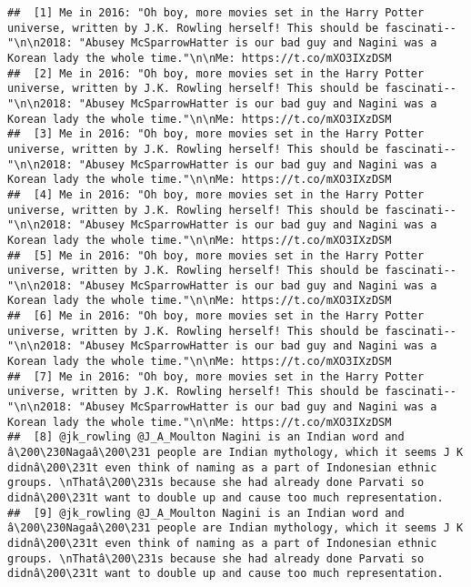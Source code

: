 \documentclass[]{article}
\begin{document}
\begin{verbatim}
##  [1] Me in 2016: "Oh boy, more movies set in the Harry Potter universe, written by J.K. Rowling herself! This should be fascinati--"\n\n2018: "Abusey McSparrowHatter is our bad guy and Nagini was a Korean lady the whole time."\n\nMe: https://t.co/mXO3IXzDSM                                          
##  [2] Me in 2016: "Oh boy, more movies set in the Harry Potter universe, written by J.K. Rowling herself! This should be fascinati--"\n\n2018: "Abusey McSparrowHatter is our bad guy and Nagini was a Korean lady the whole time."\n\nMe: https://t.co/mXO3IXzDSM                                          
##  [3] Me in 2016: "Oh boy, more movies set in the Harry Potter universe, written by J.K. Rowling herself! This should be fascinati--"\n\n2018: "Abusey McSparrowHatter is our bad guy and Nagini was a Korean lady the whole time."\n\nMe: https://t.co/mXO3IXzDSM                                          
##  [4] Me in 2016: "Oh boy, more movies set in the Harry Potter universe, written by J.K. Rowling herself! This should be fascinati--"\n\n2018: "Abusey McSparrowHatter is our bad guy and Nagini was a Korean lady the whole time."\n\nMe: https://t.co/mXO3IXzDSM                                          
##  [5] Me in 2016: "Oh boy, more movies set in the Harry Potter universe, written by J.K. Rowling herself! This should be fascinati--"\n\n2018: "Abusey McSparrowHatter is our bad guy and Nagini was a Korean lady the whole time."\n\nMe: https://t.co/mXO3IXzDSM                                          
##  [6] Me in 2016: "Oh boy, more movies set in the Harry Potter universe, written by J.K. Rowling herself! This should be fascinati--"\n\n2018: "Abusey McSparrowHatter is our bad guy and Nagini was a Korean lady the whole time."\n\nMe: https://t.co/mXO3IXzDSM                                          
##  [7] Me in 2016: "Oh boy, more movies set in the Harry Potter universe, written by J.K. Rowling herself! This should be fascinati--"\n\n2018: "Abusey McSparrowHatter is our bad guy and Nagini was a Korean lady the whole time."\n\nMe: https://t.co/mXO3IXzDSM                                          
##  [8] @jk_rowling @J_A_Moulton Nagini is an Indian word and â\200\230Nagaâ\200\231 people are Indian mythology, which it seems J K didnâ\200\231t even think of naming as a part of Indonesian ethnic groups. \nThatâ\200\231s because she had already done Parvati so didnâ\200\231t want to double up and cause too much representation.
##  [9] @jk_rowling @J_A_Moulton Nagini is an Indian word and â\200\230Nagaâ\200\231 people are Indian mythology, which it seems J K didnâ\200\231t even think of naming as a part of Indonesian ethnic groups. \nThatâ\200\231s because she had already done Parvati so didnâ\200\231t want to double up and cause too much representation.

\end{verbatim}
\end{document}
